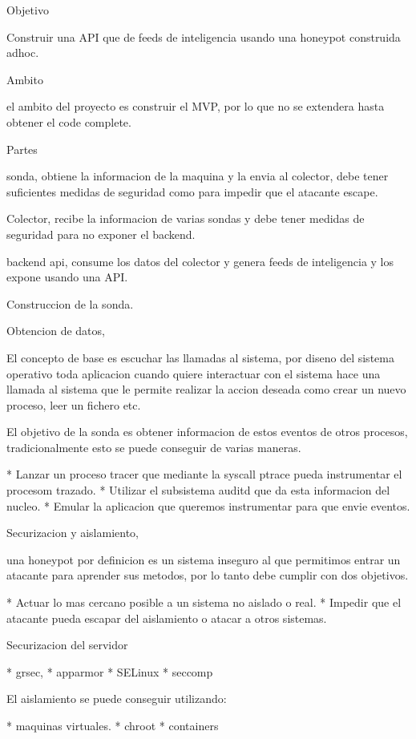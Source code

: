 Objetivo

Construir una API que de feeds de inteligencia usando una honeypot construida adhoc.

Ambito

el ambito del proyecto es construir el MVP, por lo que no se extendera hasta obtener el code complete.

Partes

sonda, obtiene la informacion de la maquina y la envia al colector, debe tener suficientes medidas
de seguridad como para impedir que el atacante escape.

Colector, recibe la informacion de varias sondas y debe tener medidas de seguridad para no exponer
el backend.

backend api, consume los datos del colector y genera feeds de inteligencia y los expone usando
una API.

Construccion de la sonda.

Obtencion de datos,

El concepto de base es escuchar las llamadas al sistema, por diseno del sistema operativo
toda aplicacion cuando quiere interactuar con el sistema hace una llamada al sistema que le
permite realizar la accion deseada como crear un nuevo proceso, leer un fichero etc.

El objetivo de la sonda es obtener informacion de estos eventos de otros procesos, tradicionalmente
esto se puede conseguir de varias maneras.

* Lanzar un proceso tracer que mediante la syscall ptrace pueda instrumentar el procesom trazado.
* Utilizar el subsistema auditd que da esta informacion del nucleo.
* Emular la aplicacion que queremos instrumentar para que envie eventos.


Securizacion y aislamiento,

una honeypot por definicion es un sistema inseguro al que permitimos entrar un atacante para
aprender sus metodos, por lo tanto debe cumplir con dos objetivos.

* Actuar lo mas cercano posible a un sistema no aislado o real.
* Impedir que el atacante pueda escapar del aislamiento o atacar a otros sistemas.

Securizacion del servidor

* grsec,
* apparmor
* SELinux
* seccomp

El aislamiento se puede conseguir utilizando:

* maquinas virtuales.
* chroot
* containers



